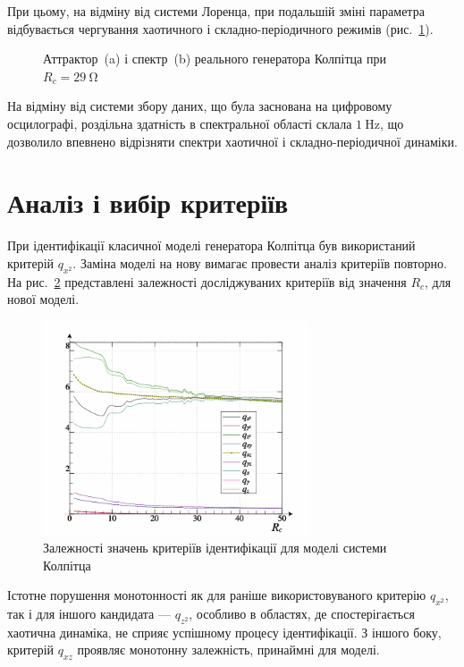 При цьому, на відміну від системи Лоренца, при подальшій
зміні параметра відбувається чергування хаотичного і
складно-періодичного режимів (рис.~\ref{atu:f:colp_r_attr_f_29}).

\begin{figure}[htb!]
  \caption{Аттрактор~(a) і спектр~(b) реального генератора Колпітца при $ R_c = \SI{29}{\ohm} $}
\label{atu:f:colp_r_attr_f_29}
\end{figure}

На відміну від системи збору даних, що була заснована на цифровому
осцилографі, роздільна здатність в спектральної області склала
$\SI{1}{\hertz} $, що дозволило впевнено відрізняти спектри хаотичної
і складно-періодичної динаміки.


\section{Аналіз і вибір критеріїв}  %

При ідентифікації класичної моделі генератора Колпітца був
використаний критерій
$q_{x^2} $. Заміна моделі на нову вимагає провести аналіз критеріїв
повторно. На рис.~\ref{atu:f:colp_bjt_q-p_Rc_q} представлені залежності
досліджуваних критеріїв від значення
$R_c $, для нової моделі.

\begin{figure}[htb!]
\centerline{\includegraphics[width=0.7\textwidth]{p/colp_bjt_q-p_Rc_q.png} }
\caption{Залежності значень критеріїв ідентифікації для моделі системи Колпітца}
\label{atu:f:colp_bjt_q-p_Rc_q}
\end{figure}

Істотне порушення монотонності як для раніше використовуваного
критерію
$q_{x^2} $, так і для іншого кандидата ---
$q_{z^2} $, особливо в областях, де спостерігається хаотична
динаміка, не сприяє успішному процесу ідентифікації. З іншого
боку, критерій
$q_{xz} $ проявляє монотонну залежність, принаймні для моделі.

